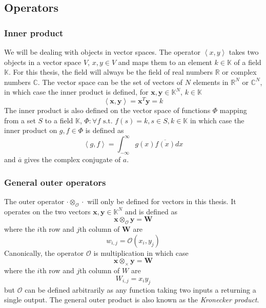 \subsection{Operators}

\subsubsection{Inner product}

We will be dealing with objects in vector spaces. The operator $\left\langle
x, y \right\rangle$ takes two objects in a vector space $V$, $x,y \in V$ and maps
them to an element $k \in \mathbb{K}$ of a field $\mathbb{K}$.
For this thesis, the field will always be the field of real numbers
$\mathbb{R}$ or complex numbers $\mathbb{C}$. The vector space can be the set of
vectors of $N$ elements in $\mathbb{R}^{N}$ or $\mathbb{C}^{N}$, in which case
the inner product is defined, for $\boldsymbol{x},\boldsymbol{y} \in
\mathbb{K}^{N}$, $k \in \mathbb{K}$
\[
    \left\langle  \boldsymbol{x}, \boldsymbol{y} \right\rangle =
\boldsymbol{x}^{T} \boldsymbol{y} = k
\]
The inner product is also defined on
the vector space of functions $\Phi$
mapping from a set $S$ to a field $\mathbb{K}$, $\Phi : \forall f \text{ s.t. } f(s) = k, s \in S,k \in
\mathbb{K} $ in which case the inner product on $g,f \in \Phi$ is
defined as
\[
    \left\langle  g, f \right\rangle =
\int_{-\infty}^{\infty} g(x) \overline{f(x)} dx
\]
and $\overline{a}$ gives the complex conjugate of $a$.

\subsubsection{General outer operators}

The outer operator $\cdotp \otimes_{\mathcal{O}} \cdotp$ will only be defined for
vectors in this thesis. It operates on the two vectors $\boldsymbol{x},\boldsymbol{y} \in
\mathbb{K}^{N}$ and is defined as
\[
    \boldsymbol{x} \otimes_{\mathcal{O}} \boldsymbol{y} = \boldsymbol{W}
\] where the $i$th row and $j$th column of $\boldsymbol{W}$ are
\[
    w_{i,j} = \mathcal{O} (x_{i},y_{j})
\]
Canonically, the operator $\mathcal{O}$ is multiplication in which case
\[
    \boldsymbol{x} \otimes_{\times} \boldsymbol{y} = \boldsymbol{W}
\] where the $i$th row and $j$th column of $W$ are
\[
    W_{i,j} = x_{i} y_{j}
\]
but $\mathcal{O}$ can be defined arbitrarily as any function taking two inputs a
returning a single output. The general outer product is also known as the
\textit{Kronecker product}.

